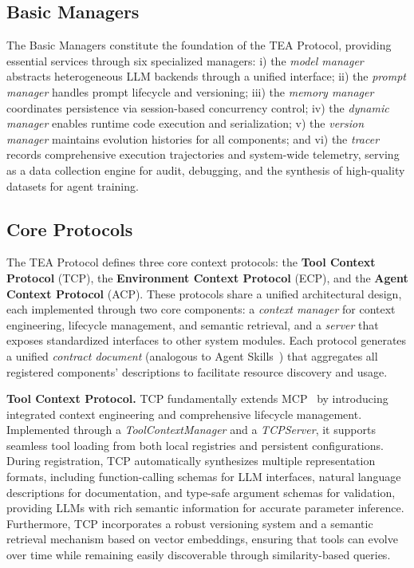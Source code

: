 \documentclass[11pt]{article}
\begin{document}
\subsection{Basic Managers}
The Basic Managers constitute the foundation of the TEA Protocol, providing essential services through six specialized managers: i) the \textit{model manager} abstracts heterogeneous LLM backends through a unified interface; ii) the \textit{prompt manager} handles prompt lifecycle and versioning; iii) the \textit{memory manager} coordinates persistence via session-based concurrency control; iv) the \textit{dynamic manager} enables runtime code execution and serialization; v) the \textit{version manager} maintains evolution histories for all components; and vi) the \textit{tracer} records comprehensive execution trajectories and system-wide telemetry, serving as a data collection engine for audit, debugging, and the synthesis of high-quality datasets for agent training.

\subsection{Core Protocols}

The TEA Protocol defines three core context protocols: the \textbf{Tool Context Protocol} (TCP), the \textbf{Environment Context Protocol} (ECP), and the \textbf{Agent Context Protocol} (ACP). These protocols share a unified architectural design, each implemented through two core components: a \textit{context manager} for context engineering, lifecycle management, and semantic retrieval, and a \textit{server} that exposes standardized interfaces to other system modules. Each protocol generates a unified \textit{contract document} (analogous to Agent Skills~\citep{anthropic2025agentskills}) that aggregates all registered components' descriptions to facilitate resource discovery and usage.

\textbf{Tool Context Protocol.} TCP fundamentally extends MCP~\citep{anthropic2024mcp} by introducing integrated context engineering and comprehensive lifecycle management. Implemented through a \textit{ToolContextManager} and a \textit{TCPServer}, it supports seamless tool loading from both local registries and persistent configurations. During registration, TCP automatically synthesizes multiple representation formats, including function-calling schemas for LLM interfaces, natural language descriptions for documentation, and type-safe argument schemas for validation, providing LLMs with rich semantic information for accurate parameter inference. Furthermore, TCP incorporates a robust versioning system and a semantic retrieval mechanism based on vector embeddings, ensuring that tools can evolve over time while remaining easily discoverable through similarity-based queries.
\end{document}
